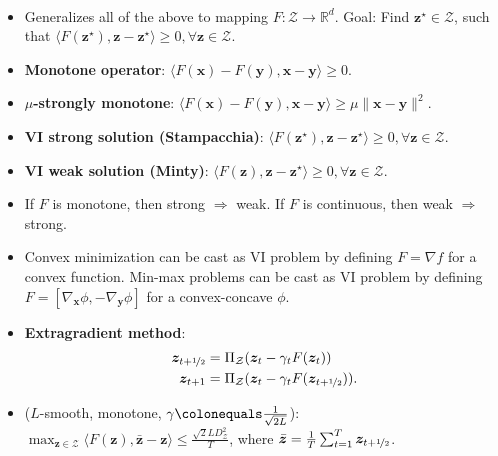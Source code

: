 \documentclass[8pt,a4paper]{extarticle}
\newcommand{\R}{\mathbb{R}}
\renewcommand{\vec}[1]{\bm{#1}}
\newenvironment{topic}[1]
{\textbf{\sffamily \colorbox{black}{\rlap{\textbf{\textcolor{white}{#1}}}\hspace{\linewidth}\hspace{-2\fboxsep}}} \\ \vspace{0.2cm}}
{}
\begin{document}
\begin{multicols*}{2}
    \begin{topic}{Variational inequalities}
        \begin{itemize}
            \item Generalizes all of the above to mapping $F: \mathcal{Z} \to \R^d$. Goal: Find $\vec{z}^\star \in
                      \mathcal{Z}$, such that $\langle F(\vec{z}^\star), \vec{z} - \vec{z}^\star \rangle \geq 0, \forall
                      \vec{z} \in \mathcal{Z}$.
            \item \textbf{Monotone operator}: $\langle F(\vec{x}) - F(\vec{y}), \vec{x} - \vec{y} \rangle \geq 0$.
            \item \textbf{$\mu$-strongly monotone}: $\langle F(\vec{x}) - F(\vec{y}), \vec{x} - \vec{y} \rangle \geq \mu \| \vec{x} - \vec{y} \|^2$.
            \item \textbf{VI strong solution (Stampacchia)}: $\langle F(\vec{z}^\star), \vec{z} - \vec{z}^\star \rangle \geq 0, \forall \vec{z} \in \mathcal{Z}$.
            \item \textbf{VI weak solution (Minty)}: $\langle F(\vec{z}), \vec{z} - \vec{z}^\star \rangle \geq 0, \forall \vec{z} \in \mathcal{Z}$.
            \item If $F$ is monotone, then strong $\Rightarrow$ weak. If $F$ is continuous, then weak $\Rightarrow$
                  strong.
            \item Convex minimization can be cast as VI problem by defining $F = \nabla f$ for a convex function.
                  Min-max problems can be cast as VI problem by defining $F = [\nabla_{\vec{x}} \phi,
                      -\nabla_{\vec{y}} \phi]$ for a convex-concave $\phi$.
            \item \textbf{Extragradient method}:
                  \begin{align*}
                      \vec{z}_{t+\nicefrac{1}{2}} & = \Pi_{\mathcal{Z}}(\vec{z}_t - \gamma_t F(\vec{z}_t))                    \\
                      \vec{z}_{t+1}               & = \Pi_{\mathcal{Z}}(\vec{z}_t - \gamma_t F(\vec{z}_{t+\nicefrac{1}{2}})).
                  \end{align*}
            \item ($L$-smooth, monotone, $\gamma \colonequals \frac{1}{\sqrt{2L}}$): \\
                  $\max_{\vec{z} \in \mathcal{Z}} \langle F(\vec{z}), \bar{\vec{z}} - \vec{z} \rangle \leq \frac{\sqrt{2} LD_{\mathcal{Z}}^2}{T}$, where $\bar{\vec{z}} = \frac{1}{T} \sum_{t=1}^{T} \vec{z}_{t+\nicefrac{1}{2}}$.

\end{itemize}
\end{topic}
\end{multicols*}
\end{document}
